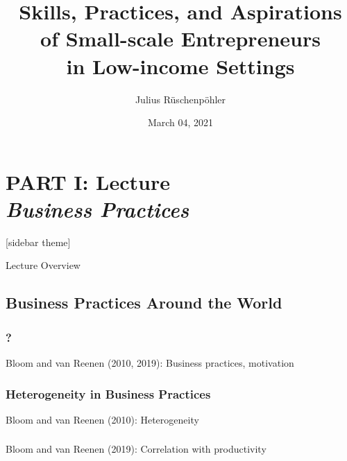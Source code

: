 \documentclass[hideothersubsections, usenames,dvipsnames,10pt]{beamer}
\title[]{Skills, Practices, and Aspirations \\ of Small-scale Entrepreneurs \\ in Low-income Settings}
\author[]{Julius R{\"u}schenp{\"o}hler\inst{}}
\institute[]{\inst{} UC Berkeley, CEGA}
\date{March 04, 2021}
\newenvironment{itemize_3pt}{\itemize\addtolength{\itemsep}{3pt}}{\enditemize}
\begin{document}



\section{\textbf{PART I: Lecture} \\ \quad \emph{Business Practices}}



\begin{frame}
\titlepage
\end{frame}


[sidebar theme]

\begin{frame}{Lecture Overview}
\end{frame}


\subsection{Business Practices Around the World}

\begin{frame}
\frametitle{?}
	\begin{itemize_3pt}
	\item Bloom and van Reenen (2010, 2019): Business practices, motivation \citep{Bloom2010, Bloom2019}
	\vspace{0.1in}
	\end{itemize_3pt}
\end{frame}

\begin{frame}
\frametitle{Heterogeneity in Business Practices}
	\begin{itemize_3pt}
	\item Bloom and van Reenen (2010): Heterogeneity \citep{Bloom2010}
	\vspace{0.1in}
	\end{itemize_3pt}
\end{frame}

\begin{frame}
\frametitle{}
	\begin{itemize_3pt}
	\item Bloom and van Reenen (2019): Correlation with productivity \citep{Bloom2019}
	\vspace{0.1in}
	\end{itemize_3pt}
\end{frame}
\end{document}
